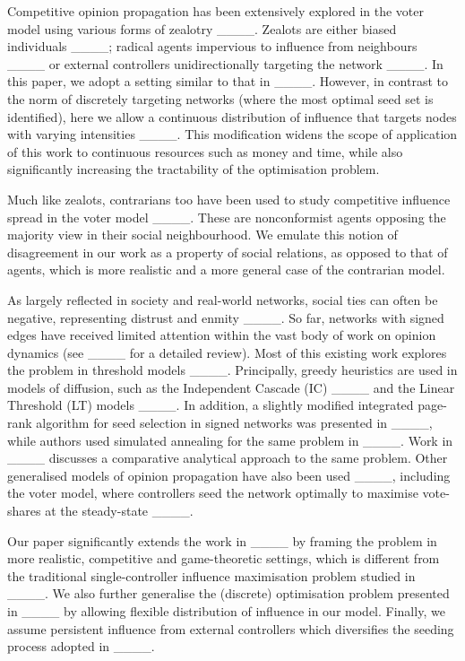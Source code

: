 Competitive opinion propagation has been extensively explored in the voter model using various forms of zealotry ____. Zealots are either biased individuals ____; radical agents impervious to influence from neighbours  ____ or external controllers unidirectionally targeting the network ____. In this paper, we adopt a setting similar to that in ____. However, in contrast to the norm of discretely targeting networks (where the most optimal seed set is identified), here we allow a continuous distribution of influence that targets nodes with varying intensities ____. This modification widens the scope of application of this work to continuous resources such as money and time, while also significantly increasing the tractability of the optimisation problem.
 
 Much like zealots, contrarians too have been used to study competitive influence spread in the voter model ____. These are nonconformist agents opposing the majority view in their social neighbourhood. 
 We emulate this notion of disagreement in our work as a property of social relations, as opposed to that of agents, which is more realistic and a more general case of the contrarian model. 


  As largely reflected in society and real-world networks, social ties can often be negative, representing distrust and enmity ____.
 So far, networks with signed edges have received limited attention within the vast body of work on opinion dynamics (see ____ for a detailed review). Most of this existing work explores the problem in threshold models ____. Principally, greedy heuristics are used in models of diffusion, such as the Independent Cascade (IC) ____ and the Linear Threshold (LT) models ____. 
 In addition, a slightly modified integrated page-rank algorithm for seed selection in signed networks was presented in ____, while authors used simulated annealing for the same problem in ____. Work in ____ discusses a comparative analytical approach to the same problem. Other generalised models of opinion propagation have also been used ____, including the voter model, where controllers seed the network optimally to maximise vote-shares at the steady-state ____. 
 
 
 Our paper significantly extends the work in ____ by framing the problem in more realistic, competitive and game-theoretic settings, which is different from the traditional single-controller influence maximisation problem studied in ____. We also further generalise the (discrete) optimisation problem presented in ____ by allowing flexible distribution of influence in our model. Finally, we assume persistent influence from external controllers which diversifies the seeding process adopted in ____.